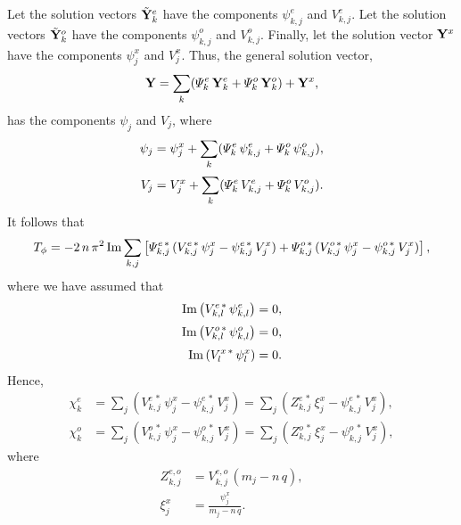 \documentclass[12pt,prb,aps,notitlepage]{revtex4-1}
\begin{document}
Let the solution vectors $\tilde{\bf Y}_k^e$ have the components $\psi_{k,j}^e$ and $V_{k,j}^e$. 
Let the solution vectors $\tilde{\bf Y}_k^o$ have the components $\psi_{k,j}^o$ and $V_{k,j}^o$. 
Finally, let the solution vector ${\bf Y}^x$ have the components $\psi_j^x$ and $V_j^x$. 
Thus, the general solution vector,
\begin{equation}
{\bf Y} = \sum_k ({\mit\Psi}_k^e\,{\bf Y}_k^e + {\mit\Psi}_k^o\,{\bf Y}_k^o) + {\bf Y}^x,
\end{equation}
has the components $\psi_j$ and $V_j$, where
\begin{align}
\psi_j &=  \psi_j^x + \sum_k({\mit\Psi}_k^e\,\psi_{k,j}^e+ {\mit\Psi}_k^o\,\psi_{k,j}^o),\\[0.5ex]
V_j&= V_j^x + \sum_k({\mit\Psi}_k^e\,V_{k,j}^e+ {\mit\Psi}_k^o\,V_{k,j}^o).
\end{align}
It follows that
\begin{equation}
T_\phi = -2\,n\,\pi^2\,{\rm Im}\sum_{k,j}\left[{\mit\Psi}_{k,j}^{e\,\ast}\,(V_{k,j}^{e\,\ast}\,\psi_j^x - \psi_{k,j}^{e\,\ast}\,V_j^x)+ {\mit\Psi}_{k,j}^{o\,\ast}\,(V_{k,j}^{o\,\ast}\,\psi_j^x - \psi_{k,j}^{o\,\ast}\,V_j^x)\right],
\end{equation}
where we have assumed that
\begin{align}
{\rm Im}\left(V_{k,l}^{e\,\ast}\,\psi_{k,l}^e\right)&=0,\\[0.5ex]
{\rm Im}\left(V_{k,l}^{o\,\ast}\,\psi_{k,l}^o\right)&=0,\\[0.5ex]
{\rm Im}\left(V_l^{x\,\ast}\,\psi_l^x\right)&=0.
\end{align}
Hence,
\begin{align}
\chi_k^e &= \sum_j\left(V_{k,j}^{e\,\ast}\,\psi_j^x - \psi_{k,j}^{e\,\ast}\,V_j^x\right)=\sum_j\left(Z_{k,j}^{e\,\ast}\,\xi_{j}^x
-\psi_{k,j}^{e\,\ast}\,V_{j}^x\right) ,\\[0.5ex]
\chi_k^o &= \sum_j\left(V_{k,j}^{o\,\ast}\,\psi_j^x - \psi_{k,j}^{o\,\ast}\,V_j^x\right)=\sum_j\left(Z_{k,j}^{o\,\ast}\,\xi_{j}^x
-\psi_{k,j}^{o\,\ast}\,V_{j}^x\right),
\end{align}
where
\begin{align}
Z_{k,j}^{e,o} &= V_{k,j}^{e,o}\,(m_j-n\,q),\\[0.5ex]
\xi_{j}^x &= \frac{\psi_{j}^x}{m_j-n\,q}.
\end{align}
\end{document}
